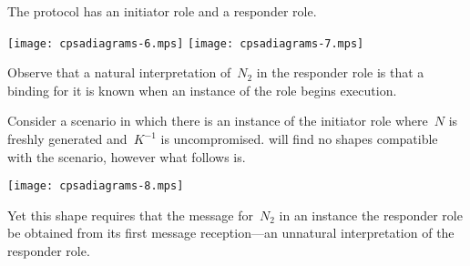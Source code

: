 \documentclass[12pt]{article}
\begin{document}
The protocol has an initiator role and a responder role.
\begin{center}
\texttt{[image: cpsadiagrams-6.mps]}\hfil
\texttt{[image: cpsadiagrams-7.mps]}
\end{center}

Observe that a natural interpretation of~$N_2$ in the responder role
is that a binding for it is known when an instance of the role begins
execution.

Consider a scenario in which there is an instance of the initiator
role where~$N$ is freshly generated and~$K^{-1}$ is uncompromised.
{\cpsa} will find no shapes compatible with the scenario, however what
follows is.
\begin{center}
\texttt{[image: cpsadiagrams-8.mps]}
\end{center}
Yet this shape requires that the message for~$N_2$ in an instance the
responder role be obtained from its first message reception---an
unnatural interpretation of the responder role.




\printindex
\end{document}

